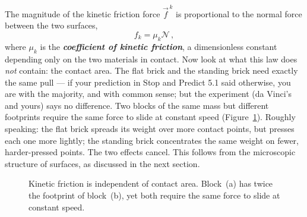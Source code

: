 The magnitude of the kinetic friction force $\vec{f}^{\,k}$ is proportional to the normal force between the two surfaces,
\begin{equation}
    f_k = \mu_k \mathscr{N}\,,
\end{equation}
where $\mu_k$ is the \textbf{\textit{coefficient of kinetic friction}}, a dimensionless constant depending only on the two materials in contact. Now look at what this law does \emph{not} contain: the contact area. The flat brick and the standing brick need exactly the same pull --- if your prediction in Stop and Predict 5.1 said otherwise, you are with the majority, and with common sense; but the experiment (da Vinci's and yours) says no difference. Two blocks of the same mass but different footprints require the same force to slide at constant speed (Figure~\ref{fig:kineticarea}). Roughly speaking: the flat brick spreads its weight over more contact points, but presses each one more lightly; the standing brick concentrates the same weight on fewer, harder-pressed points. The two effects cancel. This follows from the microscopic structure of surfaces, as discussed in the next section.

\begin{figure}[ht]
\centering
{}
\caption{Kinetic friction is independent of contact area. Block~(a) has twice the footprint of block~(b), yet both require the same force to slide at constant speed.}
\label{fig:kineticarea}
\end{figure}


